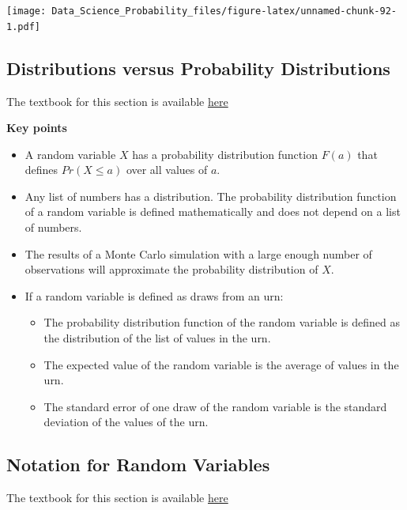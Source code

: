 \documentclass[
]{article}
\providecommand{\tightlist}{%
  \setlength{\itemsep}{0pt}\setlength{\parskip}{0pt}}
\begin{document}
\texttt{[image: Data\_Science\_Probability\_files/figure-latex/unnamed-chunk-92-1.pdf]}

\hypertarget{distributions-versus-probability-distributions}{%
\subsection{Distributions versus Probability
Distributions}\label{distributions-versus-probability-distributions}}

The textbook for this section is available
\href{https://rafalab.github.io/dsbook/random-variables.html\#distributions-versus-probability-distributions}{here}

\textbf{Key points}

\begin{itemize}
\tightlist
\item
  A random variable \(X\) has a probability distribution function
  \(F(a)\) that defines \(Pr(X \le a)\) over all values of \(a\).
\item
  Any list of numbers has a distribution. The probability distribution
  function of a random variable is defined mathematically and does not
  depend on a list of numbers.
\item
  The results of a Monte Carlo simulation with a large enough number of
  observations will approximate the probability distribution of \(X\).
\item
  If a random variable is defined as draws from an urn:

  \begin{itemize}
  \tightlist
  \item
    The probability distribution function of the random variable is
    defined as the distribution of the list of values in the urn.
  \item
    The expected value of the random variable is the average of values
    in the urn.
  \item
    The standard error of one draw of the random variable is the
    standard deviation of the values of the urn.
  \end{itemize}
\end{itemize}

\hypertarget{notation-for-random-variables}{%
\subsection{Notation for Random
Variables}\label{notation-for-random-variables}}

The textbook for this section is available
\href{https://rafalab.github.io/dsbook/random-variables.html\#notation-for-random-variables}{here}
\end{document}
